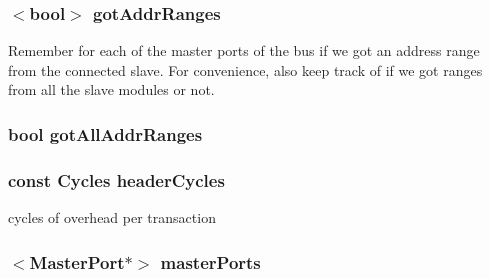 \label{classBaseBus_aacb632304c6d3351600303116de8870d}
\hypertarget{classBaseBus_ace0f90dcdbf1c53391c0971acc0269ec}{
\subsubsection[{gotAddrRanges}]{$<$bool$>$ {\bf gotAddrRanges}}}
\label{classBaseBus_ace0f90dcdbf1c53391c0971acc0269ec}
Remember for each of the master ports of the bus if we got an address range from the connected slave. For convenience, also keep track of if we got ranges from all the slave modules or not. \hypertarget{classBaseBus_a0c924502f5e6c095ac7dcbdaf3e177a4}{
\subsubsection[{gotAllAddrRanges}]{\setlength{\rightskip}{0pt plus 5cm}bool {\bf gotAllAddrRanges}}}
\label{classBaseBus_a0c924502f5e6c095ac7dcbdaf3e177a4}
\hypertarget{classBaseBus_ab9c87c91aa592a3542152117cdb99c9b}{
\subsubsection[{headerCycles}]{\setlength{\rightskip}{0pt plus 5cm}const {\bf Cycles} {\bf headerCycles}}}
\label{classBaseBus_ab9c87c91aa592a3542152117cdb99c9b}
cycles of overhead per transaction \hypertarget{classBaseBus_a0f7b2e1619b03085b0a28bb3216cd562}{
\subsubsection[{masterPorts}]{$<${\bf MasterPort}$\ast$$>$ {\bf masterPorts}}}
